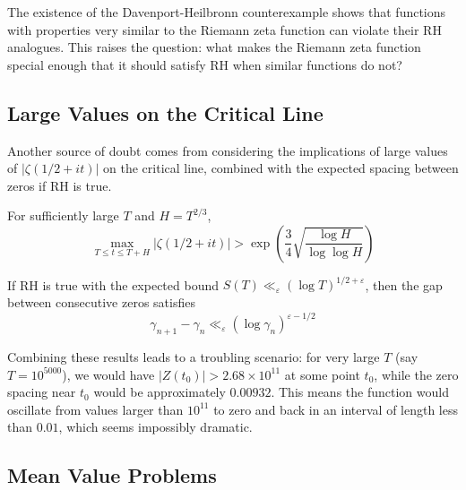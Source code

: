\begin{remark}
The existence of the Davenport-Heilbronn counterexample shows that functions with properties very similar to the Riemann zeta function can violate their RH analogues. This raises the question: what makes the Riemann zeta function special enough that it should satisfy RH when similar functions do not?
\end{remark}

\subsection{Large Values on the Critical Line}
\label{subsec:large_values}

Another source of doubt comes from considering the implications of large values of $|\zeta(1/2 + it)|$ on the critical line, combined with the expected spacing between zeros if RH is true.

\begin{theorem}
For sufficiently large $T$ and $H = T^{2/3}$,
\begin{equation}
\max_{T \leq t \leq T+H} |\zeta(1/2 + it)| > \exp\left(\frac{3}{4} \sqrt{\frac{\log H}{\log \log H}}\right)
\end{equation}
\end{theorem}

If RH is true with the expected bound $S(T) \ll_\varepsilon (\log T)^{1/2+\varepsilon}$, then the gap between consecutive zeros satisfies
\begin{equation}
\gamma_{n+1} - \gamma_n \ll_\varepsilon (\log \gamma_n)^{\varepsilon-1/2}
\end{equation}

\begin{remark}
Combining these results leads to a troubling scenario: for very large $T$ (say $T = 10^{5000}$), we would have $|Z(t_0)| > 2.68 \times 10^{11}$ at some point $t_0$, while the zero spacing near $t_0$ would be approximately $0.00932$. This means the function would oscillate from values larger than $10^{11}$ to zero and back in an interval of length less than $0.01$, which seems impossibly dramatic.
\end{remark}

\subsection{Mean Value Problems}
\label{subsec:mean_value}

